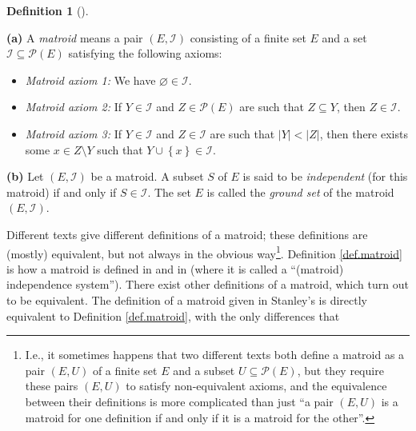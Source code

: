 \documentclass[numbers=enddot,12pt,final,onecolumn,notitlepage]{scrartcl}%
\theoremstyle{definition}
\newtheorem{defi}[theo]{Definition}
\newenvironment{definition}[1][]
{\begin{defi}[#1]\begin{leftbar}}
{\end{leftbar}\end{defi}}
\begin{document}
\begin{definition}
\label{def.matroid}\textbf{(a)} A \textit{matroid} means a pair $\left(
E,\mathcal{I}\right)  $ consisting of a finite set $E$ and a set
$\mathcal{I}\subseteq\mathcal{P}\left(  E\right)  $ satisfying the following axioms:

\begin{itemize}
\item \textit{Matroid axiom 1:} We have $\varnothing\in\mathcal{I}$.

\item \textit{Matroid axiom 2:} If $Y\in\mathcal{I}$ and $Z\in\mathcal{P}%
\left(  E\right)  $ are such that $Z\subseteq Y$, then $Z\in\mathcal{I}$.

\item \textit{Matroid axiom 3:} If $Y\in\mathcal{I}$ and $Z\in\mathcal{I}$ are
such that $\left\vert Y\right\vert <\left\vert Z\right\vert $, then there
exists some $x\in Z\setminus Y$ such that $Y\cup\left\{  x\right\}
\in\mathcal{I}$.
\end{itemize}

\textbf{(b)} Let $\left(  E,\mathcal{I}\right)  $ be a matroid. A subset $S$
of $E$ is said to be \textit{independent} (for this matroid) if and only if
$S\in\mathcal{I}$. The set $E$ is called the \textit{ground set} of the
matroid $\left(  E,\mathcal{I}\right)  $.
\end{definition}

Different texts give different definitions of a matroid; these definitions are
(mostly) equivalent, but not always in the obvious way\footnote{I.e., it
sometimes happens that two different texts both define a matroid as a pair
$\left(  E,U\right)  $ of a finite set $E$ and a subset $U\subseteq
\mathcal{P}\left(  E\right)  $, but they require these pairs $\left(
E,U\right)  $ to satisfy non-equivalent axioms, and the equivalence between
their definitions is more complicated than just \textquotedblleft a pair
$\left(  E,U\right)  $ is a matroid for one definition if and only if it is a
matroid for the other\textquotedblright.}. Definition \ref{def.matroid} is how
a matroid is defined in \cite[\S 10.1]{Schrij13} and in \cite[Definition
3.15]{Martin15} (where it is called a \textquotedblleft(matroid) independence
system\textquotedblright). There exist other definitions of a matroid, which
turn out to be equivalent. The definition of a matroid given in Stanley's
\cite[Definition 3.8]{Stanley} is directly equivalent to Definition
\ref{def.matroid}, with the only differences that
\end{document}
